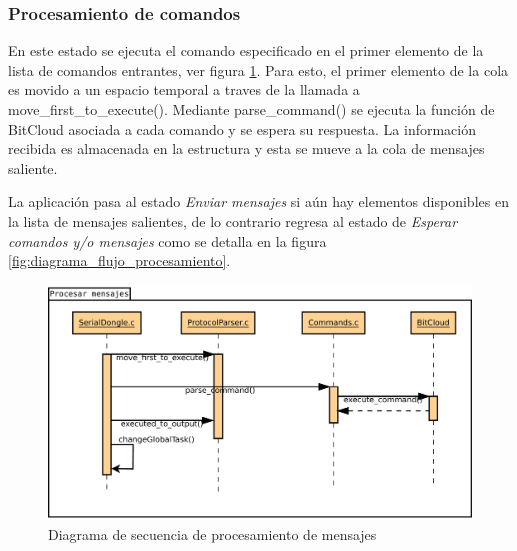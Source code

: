 \subsubsection{Procesamiento de comandos}

En este estado se ejecuta el comando especificado en el primer elemento de la lista de comandos entrantes, ver figura \ref{fig:diagrama_secuencia_procesamiento}. Para esto, el primer elemento de la cola es movido a un espacio temporal a traves de la llamada a move\_first\_to\_execute(). Mediante parse\_command() se ejecuta la función de BitCloud asociada a cada comando y se espera su respuesta. La información recibida es almacenada en la estructura y esta se mueve a la cola de mensajes saliente.

La aplicación pasa al estado \textit{Enviar mensajes} si aún hay elementos disponibles en la lista de mensajes salientes, de lo contrario regresa al estado de \textit{Esperar comandos y/o mensajes} como se detalla en la figura \ref{fig:diagrama_flujo_procesamiento}. 

\begin{figure}
	\centering
	\includegraphics[scale=0.35]{capitulo_3_imgs/procesar_mensajes_secuencia.pdf}
	\caption{Diagrama de secuencia de procesamiento de mensajes}
	\label{fig:diagrama_secuencia_procesamiento}
\end{figure}

